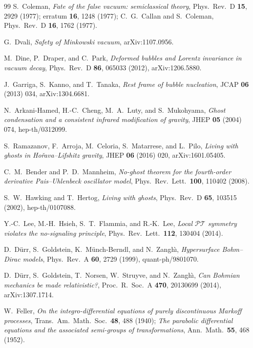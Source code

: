 \documentclass[11pt]{article}
\theoremstyle{definition}
\theoremstyle{remark}
\newcommand{\PT}{\mathcal{PT}}
\begin{document}
\begin{thebibliography}{99}
S.~Coleman,
\emph{Fate of the false vacuum: semiclassical theory},
Phys.\ Rev.\ D \textbf{15}, 2929 (1977); erratum \textbf{16}, 1248
(1977);
C.~G.~Callan and S.~Coleman,
Phys.\ Rev.\ D \textbf{16}, 1762 (1977).

G.~Dvali,
\emph{Safety of Minkowski vacuum},
arXiv:1107.0956.

M.~Dine, P.~Draper, and C.~Park,
\emph{Deformed bubbles and Lorentz invariance in vacuum decay},
Phys.\ Rev.\ D \textbf{86}, 065033 (2012), arXiv:1206.5880.

J.~Garriga, S.~Kanno, and T.~Tanaka,
\emph{Rest frame of bubble nucleation},
JCAP \textbf{06} (2013) 034, arXiv:1304.6681.

N.~Arkani-Hamed, H.-C.~Cheng, M.~A.~Luty, and S.~Mukohyama,
\emph{Ghost condensation and a consistent infrared modification of
gravity},
JHEP \textbf{05} (2004) 074, hep-th/0312099.

S.~Ramazanov, F.~Arroja, M.~Celoria, S.~Matarrese, and L.~Pilo,
\emph{Living with ghosts in Ho\v rava--Lifshitz gravity},
JHEP \textbf{06} (2016) 020, arXiv:1601.05405.

C.~M.~Bender and P.~D.~Mannheim,
\emph{No-ghost theorem for the fourth-order derivative
Pais--Uhlenbeck oscillator model},
Phys.\ Rev.\ Lett.\ \textbf{100}, 110402 (2008).

S.~W.~Hawking and T.~Hertog,
\emph{Living with ghosts},
Phys.\ Rev.\ D \textbf{65}, 103515 (2002), hep-th/0107088.

Y.-C.~Lee, M.-H.~Hsieh, S.~T.~Flammia, and R.-K.~Lee,
\emph{Local $\PT$ symmetry violates the no-signaling principle},
Phys.\ Rev.\ Lett.\ \textbf{112}, 130404 (2014).

D.~D\"urr, S.~Goldstein, K.~M\"unch-Berndl, and N.~Zangh\`\i,
\emph{Hypersurface Bohm--Dirac models},
Phys.\ Rev.\ A \textbf{60}, 2729 (1999), quant-ph/9801070.

D.~D\"urr, S.~Goldstein, T.~Norsen, W.~Struyve, and N.~Zangh\`\i,
\emph{Can Bohmian mechanics be made relativistic?},
Proc.\ R.\ Soc.\ A \textbf{470}, 20130699 (2014), arXiv:1307.1714.

W.~Feller,
\emph{On the integro-differential equations of purely discontinuous
Markoff processes},
Trans.\ Am.\ Math.\ Soc.\ \textbf{48}, 488 (1940);
\emph{The parabolic differential equations and the associated
semi-groups of transformations},
Ann.\ Math.\ \textbf{55}, 468 (1952).


\end{thebibliography}
\end{document}
